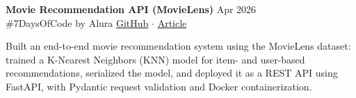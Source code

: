 \vspace{0.2em}
\noindent
\textbf{Movie Recommendation API (MovieLens)} \hfill Apr 2026 \\
\#7DaysOfCode by Alura \hfill \href{https://github.com/barlettab/movie-lens-model-api}{GitHub} $\cdot$ \href{https://medium.com/@barlettabc/recommendation-engines-how-to-build-one-with-movielens-65895e538da7}{Article}
\vspace{0.1em}
\begin{zitemize}
\setlength{\itemsep}{0.1em}
    \item Built an end-to-end movie recommendation system using the MovieLens dataset: trained a K-Nearest Neighbors (KNN) model for item- and user-based recommendations, serialized the model, and deployed it as a REST API using FastAPI, with Pydantic request validation and Docker containerization.
\end{zitemize}
\vspace{0.2em}
